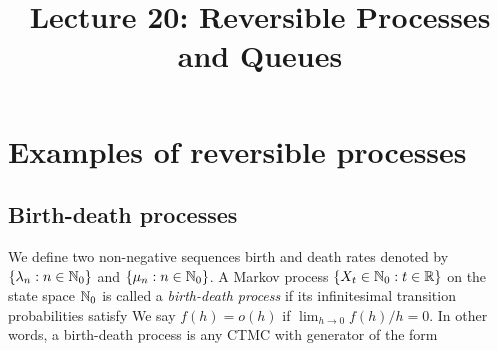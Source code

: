 \documentclass[a4paper,10pt,english]{article}
\title{Lecture 20: Reversible Processes and Queues}
\author{}
\begin{document}
\maketitle

\section{Examples of reversible processes}
\subsection{Birth-death processes}
We define two non-negative sequences birth and death rates denoted by $\{\lambda_n: n \in \mathbb{N}_0\}$ and $\{\mu_n: n \in \mathbb{N}_0\}$. 
A Markov process $\{X_t \in \mathbb{N}_0: t \in \mathbb{R}\}$ on the state space $\mathbb{N}_0$ is called a \textit{birth-death process} if its infinitesimal transition probabilities satisfy
We say $f(h) = o(h)$ if $\lim_{h \to 0} f(h)/h = 0$.
In other words, a birth-death process is any CTMC with generator of the form 
\end{document}
